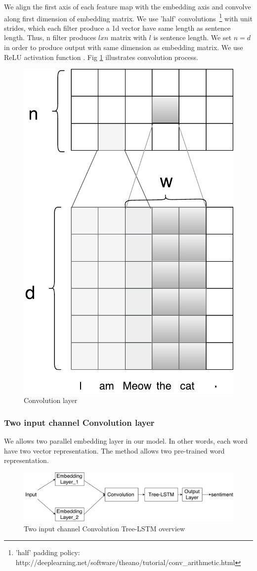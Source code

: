 We align the first axis of each feature map with the embedding axis and convolve along first dimension of embedding matrix. 
We use 'half' convolutions~\footnote{'half' padding policy: http://deeplearning.net/software/theano/tutorial/conv\_arithmetic.html} with unit strides, which each filter produce a 1d vector have same length as sentence length. 
Thus, n filter produces $l x n$ matrix with $l$ is sentence length. We set $n = d$ in order to produce output with same dimension as embedding matrix. We use ReLU activation function \cite{hahnloser2000digital}. Fig \ref{fig:convlayer} illustrates convolution process. 



\begin{figure}[H]
	\centering
	\includegraphics[width=0.6\linewidth]{figure/convlayer}
	\caption[Convolution layer]{Convolution layer}
	\label{fig:convlayer}
\end{figure}

\subsubsection{Two input channel Convolution layer}
We allows two parallel embedding layer in our model. In other words, each word have two vector representation. The method allows two pre-trained word representation. 

\begin{figure}[H]
	\centering
	\includegraphics[width=0.8\linewidth]{figure/multichannelcnnlstm}
	\caption[Convolution Tree-LSTM overview]{Two input channel Convolution Tree-LSTM overview}
	\label{fig:multichannelcnnlstm}
\end{figure}

